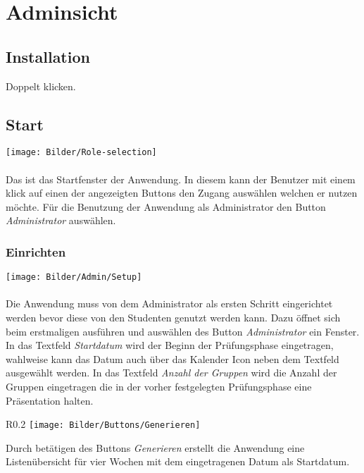 \section{Adminsicht}

\subsection{Installation}
Doppelt klicken.



\subsection{Start}
	\texttt{[image: Bilder/Role-selection]}
	\\
	\\
Das ist das Startfenster der Anwendung. In diesem kann der Benutzer mit einem klick auf einen der angezeigten Buttons den Zugang auswählen welchen er nutzen möchte. Für die Benutzung der Anwendung als Administrator den Button \textit{Administrator} auswählen. 



\subsubsection{Einrichten}
	\texttt{[image: Bilder/Admin/Setup]}
	\\
	\\
Die Anwendung muss von dem Administrator als ersten Schritt eingerichtet werden bevor diese von den Studenten genutzt werden kann. Dazu öffnet sich beim erstmaligen ausführen und auswählen des Button \textit{Administrator} ein Fenster. In das Textfeld \textit{Startdatum} wird der Beginn der Prüfungsphase eingetragen, wahlweise kann das Datum auch über das Kalender Icon neben dem Textfeld ausgewählt werden. In das Textfeld \textit{Anzahl der Gruppen} wird die Anzahl der Gruppen eingetragen die in der vorher festgelegten Prüfungsphase eine Präsentation halten. 
\\
\begin{wrapfigure}{R}{0.2\textwidth}
	\centering
	\texttt{[image: Bilder/Buttons/Generieren]}
\end{wrapfigure}

Durch betätigen des Buttons \textit{Generieren} erstellt die Anwendung eine Listenübersicht für vier Wochen mit dem eingetragenen Datum als Startdatum.



